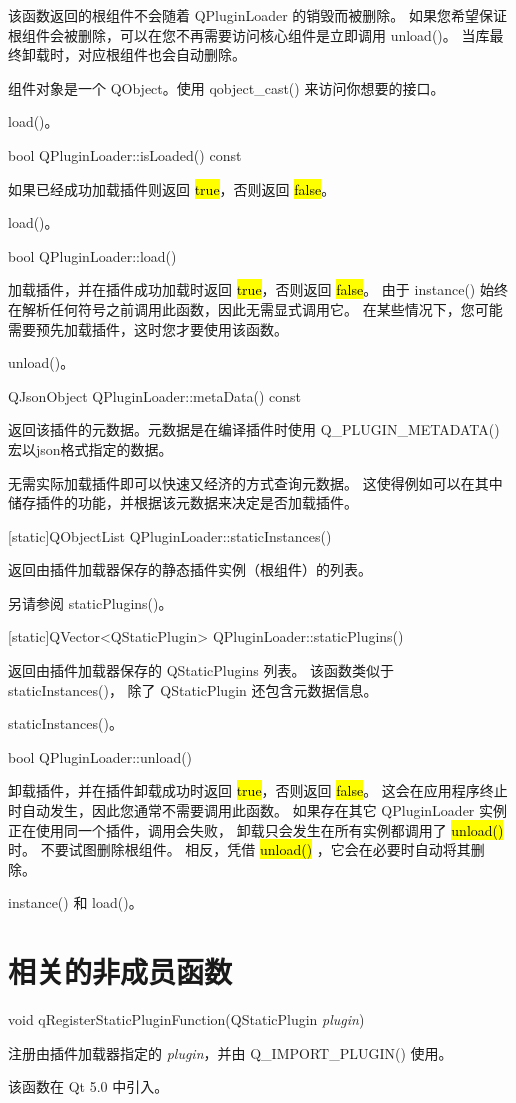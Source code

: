 该函数返回的根组件不会随着 QPluginLoader 的销毁而被删除。
如果您希望保证根组件会被删除，可以在您不再需要访问核心组件是立即调用 unload()。
当库最终卸载时，对应根组件也会自动删除。

组件对象是一个 QObject。使用 qobject\_cast() 来访问你想要的接口。

\begin{seeAlso}
load()。
\end{seeAlso}

bool QPluginLoader::isLoaded() const

如果已经成功加载插件则返回 \hl{true}，否则返回 \hl{false}。

\begin{seeAlso}
load()。
\end{seeAlso}

bool QPluginLoader::load()

加载插件，并在插件成功加载时返回 \hl{true}，否则返回 \hl{false}。
由于 instance() 始终在解析任何符号之前调用此函数，因此无需显式调用它。
在某些情况下，您可能需要预先加载插件，这时您才要使用该函数。

\begin{seeAlso}
unload()。
\end{seeAlso}

QJsonObject QPluginLoader::metaData() const

返回该插件的元数据。元数据是在编译插件时使用 Q\_PLUGIN\_METADATA() 宏以json格式指定的数据。

无需实际加载插件即可以快速又经济的方式查询元数据。
这使得例如可以在其中储存插件的功能，并根据该元数据来决定是否加载插件。

[static]QObjectList QPluginLoader::staticInstances()

返回由插件加载器保存的静态插件实例（根组件）的列表。

另请参阅 staticPlugins()。

[static]QVector<QStaticPlugin> QPluginLoader::staticPlugins()

返回由插件加载器保存的 QStaticPlugins 列表。 
该函数类似于 staticInstances()，
除了 QStaticPlugin 还包含元数据信息。

\begin{seeAlso}
staticInstances()。
\end{seeAlso}

bool QPluginLoader::unload()

卸载插件，并在插件卸载成功时返回 \hl{true}，否则返回 \hl{false}。
这会在应用程序终止时自动发生，因此您通常不需要调用此函数。
如果存在其它 QPluginLoader 实例正在使用同一个插件，调用会失败，
卸载只会发生在所有实例都调用了 \hl{unload()} 时。
不要试图删除根组件。
相反，凭借 \hl{unload()} ，它会在必要时自动将其删除。

\begin{seeAlso}
instance() 和 load()。
\end{seeAlso}

\section{相关的非成员函数}

void qRegisterStaticPluginFunction(QStaticPlugin \emph{plugin})

注册由插件加载器指定的 \emph{plugin}，并由 Q\_IMPORT\_PLUGIN() 使用。

该函数在 Qt 5.0 中引入。
